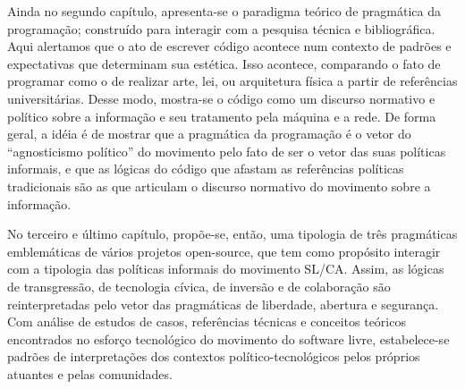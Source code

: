 Ainda no segundo capítulo, apresenta-se o paradigma teórico de pragmática da programação; construído para interagir com a pesquisa técnica e bibliográfica. Aqui alertamos que o ato de escrever código acontece num contexto de padrões e expectativas que determinam sua estética. Isso acontece, comparando o fato de programar como o de realizar arte, lei, ou arquitetura física a partir de referências universitárias. Desse modo, mostra-se o código como um discurso normativo e político sobre a informação e seu tratamento pela máquina e a rede. De forma geral, a idéia é de mostrar que a pragmática da programação é o vetor do “agnosticismo político” do movimento pelo fato de ser o vetor das suas políticas informais, e que as lógicas do código que afastam as referências políticas tradicionais são as que articulam o discurso normativo do movimento sobre a informação. 

No terceiro e último capítulo, propõe-se, então, uma tipologia de três pragmáticas emblemáticas de vários projetos open-source, que tem como propósito interagir com a tipologia das políticas informais do movimento SL/CA. Assim, as lógicas de transgressão, de tecnologia cívica, de inversão e de colaboração são reinterpretadas pelo vetor das pragmáticas de liberdade, abertura e segurança. Com análise de estudos de casos, referências técnicas e conceitos teóricos encontrados no esforço tecnológico do movimento do software livre, estabelece-se padrões de interpretações dos contextos político-tecnológicos pelos próprios atuantes e pelas comunidades.
